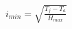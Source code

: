 \documentclass[12pt]{article}
\begin{document}
\begin{align*}
i_{min} = \sqrt{\frac{T_j - T_a}{H_{max}}}
\end{align*}
\end{document}
